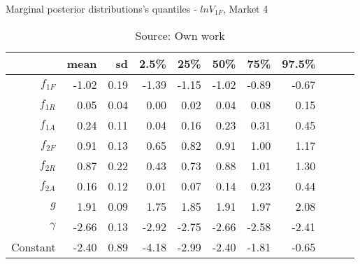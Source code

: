 \begin{table}[H]
\caption{Marginal posterior distributions's quantiles - $ln V_{1F}$,  Market 4}
\centering
\begin{tabular}{rrrrrrrrrrr}
  \toprule
          & mean  & sd   & 2.5\% & 25\%  & 50\%  & 75\%  & 97.5\%\\ 
  \hline
  $f_{1F}$ & -1.02 & 0.19 & -1.39 & -1.15 & -1.02 & -0.89 & -0.67 \\ 
  $f_{1R}$ & 0.05  & 0.04 & 0.00  & 0.02  & 0.04  & 0.08  & 0.15  \\ 
  $f_{1A}$ & 0.24  & 0.11 & 0.04  & 0.16  & 0.23  & 0.31  & 0.45  \\ 
  $f_{2F}$ & 0.91  & 0.13 & 0.65  & 0.82  & 0.91  & 1.00  & 1.17  \\ 
  $f_{2R}$ & 0.87  & 0.22 & 0.43  & 0.73  & 0.88  & 1.01  & 1.30  \\ 
  $f_{2A}$ & 0.16  & 0.12 & 0.01  & 0.07  & 0.14  & 0.23  & 0.44  \\ 
  $g$      & 1.91  & 0.09 & 1.75  & 1.85  & 1.91  & 1.97  & 2.08  \\ 
  $\gamma$ & -2.66 & 0.13 & -2.92 & -2.75 & -2.66 & -2.58 & -2.41 \\ 
  Constant & -2.40 & 0.89 & -4.18 & -2.99 & -2.40 & -1.81 & -0.65 \\ 
     \bottomrule
\end{tabular}
\caption*{Source: Own work}
\end{table}
